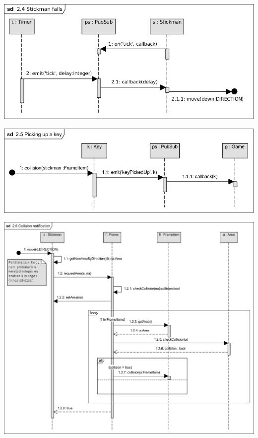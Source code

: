 \begin{center}\includegraphics[scale=1]{resources/24Stickmanfalls.png}\end{center}
\begin{center}\includegraphics[scale=1]{resources/25PickingUpKey.png}\end{center}
\begin{center}\includegraphics[scale=0.8, angle=-90]{resources/26CollisionNotification.png}\end{center}

